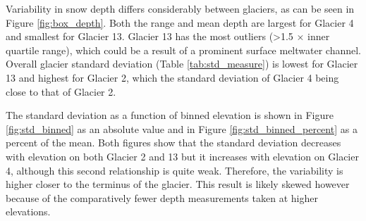 \documentclass[12pt]{article}
\begin{document}
Variability in snow depth differs considerably between glaciers, as can be seen in Figure \ref{fig:box_depth}. Both the range and mean depth are largest for Glacier 4 and smallest for Glacier 13. Glacier 13 has the most outliers (\textgreater 1.5 $\times$ inner quartile range), which could be a result of a prominent surface meltwater channel. Overall glacier standard deviation (Table \ref{tab:std_measure}) is lowest for Glacier 13 and highest for Glacier 2, which the standard deviation of Glacier 4 being close to that of Glacier 2. 

The standard deviation as a function of binned elevation is shown in Figure \ref{fig:std_binned} as an absolute value and in Figure \ref{fig:std_binned_percent} as a percent of the mean. Both figures show that the standard deviation decreases with elevation on both Glacier 2 and 13 but it increases with elevation on Glacier 4, although this second relationship is quite weak. Therefore, the variability is higher closer to the terminus of the glacier. This result is likely skewed however because of the comparatively fewer depth measurements taken at higher elevations. 
\end{document}
